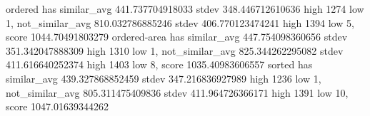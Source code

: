 ordered has similar_avg 441.737704918033 stdev 348.446712610636 high 1274 low 1, not_similar_avg 810.032786885246 stdev 406.770123474241 high 1394 low 5, score 1044.70491803279
ordered-area has similar_avg 447.754098360656 stdev 351.342047888309 high 1310 low 1, not_similar_avg 825.344262295082 stdev 411.616640252374 high 1403 low 8, score 1035.40983606557
sorted has similar_avg 439.327868852459 stdev 347.216836927989 high 1236 low 1, not_similar_avg 805.311475409836 stdev 411.964726366171 high 1391 low 10, score 1047.01639344262
